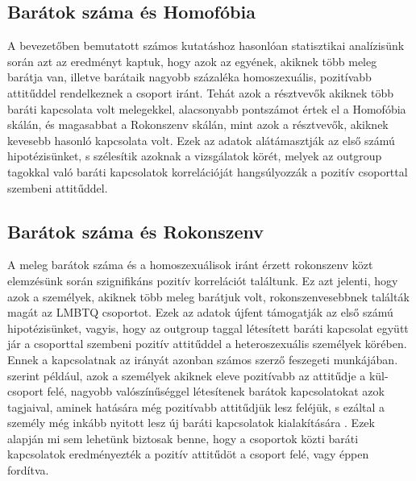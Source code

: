 \subsection{Barátok száma és Homofóbia}
A bevezetőben bemutatott számos kutatáshoz hasonlóan \parencite{dasgupta_rivera_2008,pettigrew_1997}  statisztikai analízisünk során azt az eredményt kaptuk, hogy azok az egyének, akiknek több meleg barátja van, illetve barátaik nagyobb százaléka homoszexuális, pozitívabb attitűddel rendelkeznek a csoport iránt.  Tehát azok a résztvevők akiknek több baráti kapcsolata volt melegekkel, alacsonyabb pontszámot értek el a Homofóbia skálán, és magasabbat a Rokonszenv skálán, mint azok a résztvevők, akiknek kevesebb hasonló kapcsolata volt. Ezek az adatok alátá\-masztják az első számú hipotézisünket, s szélesítik azoknak a vizsgálatok körét, melyek az outgroup tagokkal való baráti kapcsolatok korrelációját hangsúlyozzák a pozitív csoporttal szembeni attitűddel. 

\subsection{Barátok száma és Rokonszenv}
A meleg barátok száma és a homoszexuálisok iránt érzett rokonszenv közt elemzésünk során  szignifikáns pozitív korrelációt találtunk. Ez azt jelenti, hogy azok a személyek, akiknek több meleg barátjuk volt, rokonszenvesebbnek találták magát az LMBTQ csoportot. Ezek az adatok újfent támogatják az első számú hipotézisünket, vagyis, hogy az outgroup taggal létesített baráti kapcsolat együtt jár a csoporttal szembeni pozitív attitűddel a heteroszexuális személyek körében. Ennek a kapcsolatnak az irányát azonban számos szerző feszegeti munkájában. \textcite{pettigrew_1997} szerint például, azok a személyek akiknek eleve pozitívabb az attitűdje a kül-csoport felé, nagyobb valószínűséggel létesítenek barátok kapcsolatokat azok tagjaival, aminek hatására még pozitívabb attitűdjük lesz feléjük, s ezáltal a személy még inkább nyitott lesz új baráti kapcsolatok kialakítására \parencite{pettigrew_1997}. Ezek alapján mi sem lehetünk biztosak benne, hogy a csoportok közti baráti kapcsolatok eredményezték a pozitív attitűdöt a csoport felé, vagy éppen fordítva. 

